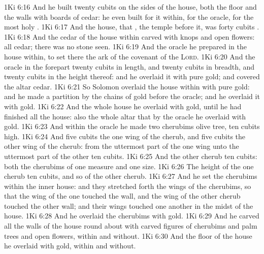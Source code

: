 \vs 1Ki 6:16 And he built twenty cubits on the sides of the house, both the floor and the walls with boards of cedar: he even built  for it within,  for the oracle,  for the most holy .
\vs 1Ki 6:17 And the house, that , the temple before it, was forty cubits .
\vs 1Ki 6:18 And the cedar of the house within  carved with knops and open flowers: all  cedar; there was no stone seen.
\vs 1Ki 6:19 And the oracle he prepared in the house within, to set there the ark of the covenant of the \textsc{Lord}.
\vs 1Ki 6:20 And the oracle in the forepart  twenty cubits in length, and twenty cubits in breadth, and twenty cubits in the height thereof: and he overlaid it with pure gold; and  covered the altar  cedar.
\vs 1Ki 6:21 So Solomon overlaid the house within with pure gold: and he made a partition by the chains of gold before the oracle; and he overlaid it with gold.
\vs 1Ki 6:22 And the whole house he overlaid with gold, until he had finished all the house: also the whole altar that  by the oracle he overlaid with gold.
\vs 1Ki 6:23 And within the oracle he made two cherubims  olive tree,  ten cubits high.
\vs 1Ki 6:24 And five cubits  the one wing of the cherub, and five cubits the other wing of the cherub: from the uttermost part of the one wing unto the uttermost part of the other  ten cubits.
\vs 1Ki 6:25 And the other cherub  ten cubits: both the cherubims  of one measure and one size.
\vs 1Ki 6:26 The height of the one cherub  ten cubits, and so  of the other cherub.
\vs 1Ki 6:27 And he set the cherubims within the inner house: and they stretched forth the wings of the cherubims, so that the wing of the one touched the  wall, and the wing of the other cherub touched the other wall; and their wings touched one another in the midst of the house.
\vs 1Ki 6:28 And he overlaid the cherubims with gold.
\vs 1Ki 6:29 And he carved all the walls of the house round about with carved figures of cherubims and palm trees and open flowers, within and without.
\vs 1Ki 6:30 And the floor of the house he overlaid with gold, within and without.
